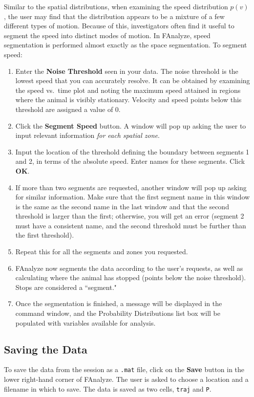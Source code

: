 \documentclass[letterpaper, 11pt]{article}
\begin{document}
Similar to the spatial distributions, when examining the speed distribution $p(v)$, the user may
find that the distribution appears to be a mixture of a few different types of motion.  Because of
this, investigators often find it useful to segment the speed into distinct modes of motion. In
FAnalyze, speed segmentation is performed almost exactly as the space segmentation. To segment
speed:
\begin{enumerate}
\item Enter the \textbf{Noise Threshold} seen in your data.  The noise threshold is the lowest speed that
you can accurately resolve.  It can be obtained by examining the speed vs.\ time plot and noting
the maximum speed attained in regions where the animal is visibly stationary.  Velocity and speed
points below this threshold are assigned a value of 0.
\item Click the \textbf{Segment Speed} button.  A window will pop up asking the user to input
relevant information \emph{for each spatial zone}.
\item Input the location of the threshold defining the boundary between segments 1 and 2, in terms of the absolute speed.  Enter names for these segments. Click \textbf{OK}.
\item If more than two segments are requested, another window will pop up asking for similar
information.  Make sure that the first segment name in this window is the same as the second name
in the last window and that the second threshold is larger than the first; otherwise, you will get
an error (segment 2 must have a consistent name, and the second threshold must be further than the
first threshold).
\item Repeat this for all the segments and zones you requested.
\item FAnalyze now segments the data according to the user's requests, as well as calculating where
the animal has stopped (points below the noise threshold).  Stops are considered a ``segment."
\item Once the segmentation is finished, a message will be displayed in the command window, and the
Probability Distributions list box will be populated with variables available for analysis.
\end{enumerate}

\subsection*{Saving the Data}
To save the data from the session as a \texttt{.mat} file, click on the \textbf{Save} button in the
lower right-hand corner of FAnalyze. The user is asked to choose a location and a filename in which
to save.  The
data is saved as two cells, \texttt{traj} and \texttt{P}.\\
\end{document}

